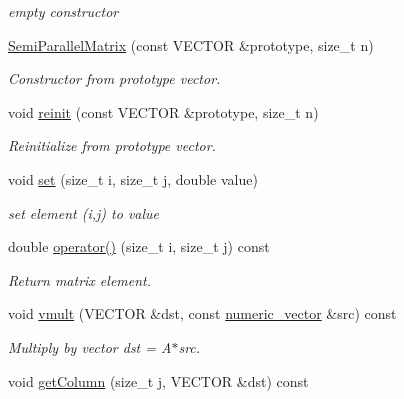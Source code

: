 \begin{DoxyCompactItemize}
\begin{DoxyCompactList}\small\item\em empty constructor \item\end{DoxyCompactList}\item 
\hyperlink{classnatrium_1_1SemiParallelMatrix_a6c8fff84bcf91369e0323eb0a762fd65}{SemiParallelMatrix} (const VECTOR \&prototype, size\_\-t n)
\begin{DoxyCompactList}\small\item\em Constructor from prototype vector. \item\end{DoxyCompactList}\item 
void \hyperlink{classnatrium_1_1SemiParallelMatrix_ae84190bdc4b753f6dc874d229d0b11a7}{reinit} (const VECTOR \&prototype, size\_\-t n)
\begin{DoxyCompactList}\small\item\em Reinitialize from prototype vector. \item\end{DoxyCompactList}\item 
void \hyperlink{classnatrium_1_1SemiParallelMatrix_a232fbaa6ca412b4f98d9c6aab19254de}{set} (size\_\-t i, size\_\-t j, double value)
\begin{DoxyCompactList}\small\item\em set element (i,j) to value \item\end{DoxyCompactList}\item 
double \hyperlink{classnatrium_1_1SemiParallelMatrix_afb8ed4b8c4a62a0271ea7b512f275555}{operator()} (size\_\-t i, size\_\-t j) const 
\begin{DoxyCompactList}\small\item\em Return matrix element. \item\end{DoxyCompactList}\item 
void \hyperlink{classnatrium_1_1SemiParallelMatrix_a544535d18e218d58541bf4a275ee96b2}{vmult} (VECTOR \&dst, const \hyperlink{namespacenatrium_a67c39077adc6634f8fa3762b8eef24c4}{numeric\_\-vector} \&src) const 
\begin{DoxyCompactList}\small\item\em Multiply by vector dst = A$\ast$src. \item\end{DoxyCompactList}\item 
void \hyperlink{classnatrium_1_1SemiParallelMatrix_a573e34e163358f87aee0f22742deda66}{getColumn} (size\_\-t j, VECTOR \&dst) const 

\end{DoxyCompactItemize}
